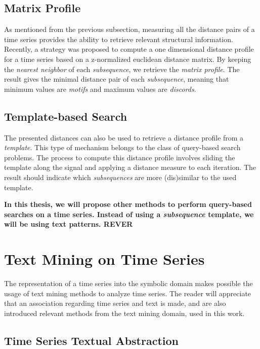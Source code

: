 \subsection{Matrix Profile}
\label{subsec:matrixprofile}

As mentioned from the previous subsection, measuring all the distance pairs of a time series provides the ability to retrieve relevant structural information. Recently, a strategy was proposed to compute a one dimensional distance profile for a time series based on a z-normalized euclidean distance matrix. By keeping the \textit{nearest neighbor} of each \textit{subsequence}, we retrieve the \textit{matrix profile}. The result gives the minimal distance pair of each \textit{subsequence}, meaning that minimum values are \textit{motifs} and maximum values are \textit{discords}.
\par


\subsection{Template-based Search}
\label{sec:query_based_search}

The presented distances can also be used to retrieve a distance profile from a \textit{template}. This type of mechanism belongs to the class of query-based search problems. The process to compute this distance profile involves sliding the template along the signal and applying a distance measure to each iteration. The result should indicate which \textit{subsequences} are more (dis)similar to the used template.
\par


\textbf{In this thesis, we will propose other methods to perform query-based searches on a time series. Instead of using a \textit{subsequence} template, we will be using text patterns. REVER}

\section{Text Mining on Time Series}
\label{sec:text_time}

The representation of a time series into the symbolic domain makes possible the usage of text mining methods to analyze time series. The reader will appreciate that an association regarding time series and text is made, and are also introduced relevant methods from the text mining domain, used in this work.

\subsection{Time Series Textual Abstraction}
\label{subsec:text_abstraction}

